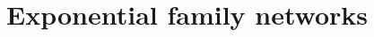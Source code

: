 \documentclass{article}
\begin{document}
%
  

% 

  
 \section{Exponential family networks}
 
\end{document}
